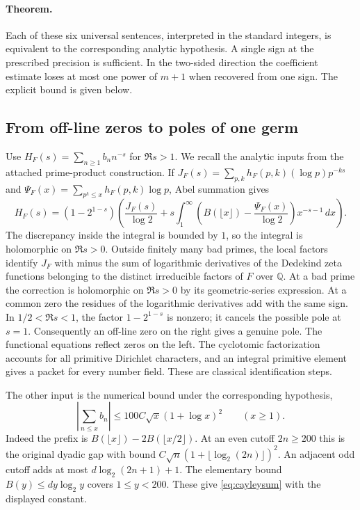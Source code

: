\paragraph{Theorem.}
Each of these six universal sentences, interpreted in the standard
integers, is equivalent to the corresponding analytic hypothesis. A single
sign at the prescribed precision is sufficient. In the two-sided direction
the coefficient estimate loses at most one power of $m+1$ when recovered
from one sign. The explicit bound is given below.

\subsection*{From off-line zeros to poles of one germ}
Use $H_F(s)=\sum_{n\ge1} b_n n^{-s}$ for $\Re s>1$.
We recall the analytic inputs from the attached prime-product construction.
If $J_F(s)=\sum_{p,k}h_F(p,k)(\log p)p^{-ks}$ and
$\Psi_F(x)=\sum_{p^k\le x}h_F(p,k)\log p$, Abel summation gives
\[
 H_F(s)=(1-2^{1-s})\left(\frac{J_F(s)}{\log 2}
 +s\int_1^\infty
 \left(B(\lfloor x\rfloor)-\frac{\Psi_F(x)}{\log 2}\right)x^{-s-1}\,dx\right).
\]
The discrepancy inside the integral is bounded by $1$, so the integral
is holomorphic on $\Re s>0$. Outside finitely many bad primes, the local
factors identify $J_F$ with minus the sum of logarithmic derivatives of
the Dedekind zeta functions belonging to the distinct irreducible factors
of $F$ over $\mathbb Q$. At a bad prime the correction is holomorphic on
$\Re s>0$ by its geometric-series expression. At a common zero the
residues of the logarithmic derivatives add with the same sign. In
$1/2<\Re s<1$, the factor $1-2^{1-s}$ is nonzero; it cancels the
possible pole at $s=1$. Consequently an off-line zero on the right gives
a genuine pole. The functional equations reflect zeros on the left.
The cyclotomic factorization accounts for all primitive Dirichlet
characters, and an integral primitive element gives a packet for every
number field. These are classical identification steps.

The other input is the numerical bound under the corresponding hypothesis,
\begin{equation}\label{eq:cayleysum}
   \left|\sum_{n\le x} b_n\right|\le 100 C\sqrt{x}(1+\log x)^2
   \qquad(x\ge1).
\end{equation}
Indeed the prefix is $B(\lfloor x\rfloor)-2B(\lfloor x/2\rfloor)$.
At an even cutoff $2n\ge200$ this is the original dyadic gap with bound
$C\sqrt n(1+\lfloor\log_2(2n)\rfloor)^2$. An adjacent odd cutoff
adds at most $d\log_2(2n+1)+1$. The elementary bound
$B(y)\le d y\log_2 y$ covers $1\le y<200$. These give
\eqref{eq:cayleysum} with the displayed constant.

